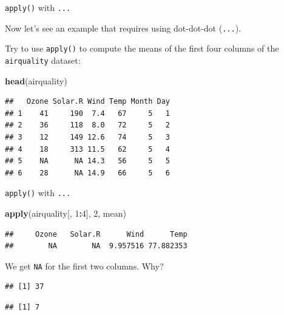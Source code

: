 \documentclass[ignorenonframetext,]{beamer}
\newenvironment{Shaded}{\begin{snugshade}}{\end{snugshade}}
\newcommand{\DecValTok}[1]{\textcolor[rgb]{0.00,0.00,0.81}{#1}}
\newcommand{\KeywordTok}[1]{\textcolor[rgb]{0.13,0.29,0.53}{\textbf{#1}}}
\newcommand{\NormalTok}[1]{#1}
\newcommand{\OperatorTok}[1]{\textcolor[rgb]{0.81,0.36,0.00}{\textbf{#1}}}
\begin{document}
\begin{frame}[fragile]{\texttt{apply()} with \texttt{...}}
\protect\hypertarget{apply-with-...}{}

Now let's see an example that requires using dot-dot-dot (\texttt{...}).

Try to use \texttt{apply()} to compute the means of the first four
columns of the \texttt{airquality} dataset:

\begin{Shaded}
\begin{Highlighting}[]
\KeywordTok{head}\NormalTok{(airquality)}
\end{Highlighting}
\end{Shaded}

\begin{verbatim}
##   Ozone Solar.R Wind Temp Month Day
## 1    41     190  7.4   67     5   1
## 2    36     118  8.0   72     5   2
## 3    12     149 12.6   74     5   3
## 4    18     313 11.5   62     5   4
## 5    NA      NA 14.3   56     5   5
## 6    28      NA 14.9   66     5   6
\end{verbatim}

\end{frame}

\begin{frame}[fragile]{\texttt{apply()} with \texttt{...}}
\protect\hypertarget{apply-with-...-1}{}

\begin{Shaded}
\begin{Highlighting}[]
\KeywordTok{apply}\NormalTok{(airquality[, }\DecValTok{1}\OperatorTok{:}\DecValTok{4}\NormalTok{], }\DecValTok{2}\NormalTok{, mean)}
\end{Highlighting}
\end{Shaded}

\begin{verbatim}
##     Ozone   Solar.R      Wind      Temp 
##        NA        NA  9.957516 77.882353
\end{verbatim}

We get \texttt{NA} for the first two columns. Why?

\begin{Shaded}
\end{Shaded}

\begin{verbatim}
## [1] 37
\end{verbatim}

\begin{Shaded}
\end{Shaded}

\begin{verbatim}
## [1] 7
\end{verbatim}

\end{frame}
\end{document}
